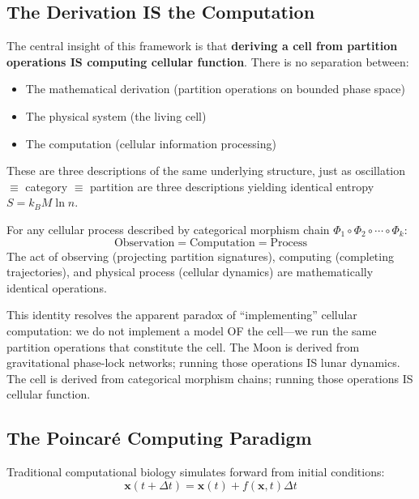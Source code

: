 \subsection{The Derivation IS the Computation}

The central insight of this framework is that \textbf{deriving a cell from partition operations IS computing cellular function}. There is no separation between:
\begin{itemize}
\item The mathematical derivation (partition operations on bounded phase space)
\item The physical system (the living cell)
\item The computation (cellular information processing)
\end{itemize}

These are three descriptions of the same underlying structure, just as oscillation $\equiv$ category $\equiv$ partition are three descriptions yielding identical entropy $S = k_B M \ln n$.

\begin{theorem}
\label{thm:identity}
For any cellular process described by categorical morphism chain $\Phi_1 \circ \Phi_2 \circ \cdots \circ \Phi_k$:
\begin{equation}
\text{Observation} = \text{Computation} = \text{Process}
\end{equation}
The act of observing (projecting partition signatures), computing (completing trajectories), and physical process (cellular dynamics) are mathematically identical operations.
\end{theorem}

This identity resolves the apparent paradox of ``implementing'' cellular computation: we do not implement a model OF the cell---we run the same partition operations that constitute the cell. The Moon is derived from gravitational phase-lock networks; running those operations IS lunar dynamics. The cell is derived from categorical morphism chains; running those operations IS cellular function.

\subsection{The Poincar\'{e} Computing Paradigm}

Traditional computational biology simulates forward from initial conditions:
\begin{equation}
\mathbf{x}(t + \Delta t) = \mathbf{x}(t) + f(\mathbf{x}, t)\Delta t
\end{equation}

